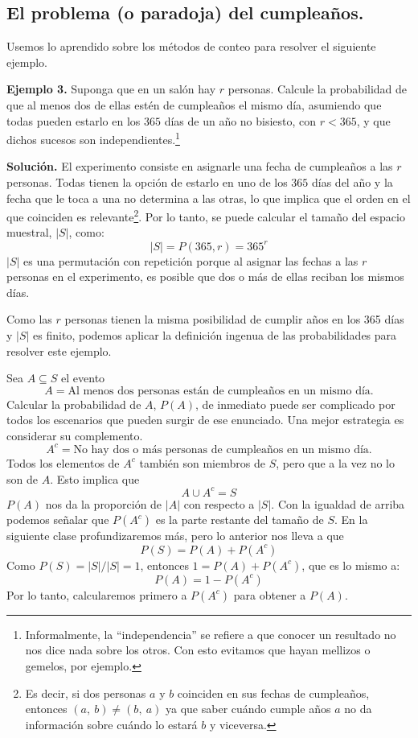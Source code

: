 \documentclass[12pt]{article}
\begin{document}
\subsection{El problema (o paradoja) del cumpleaños.}

Usemos lo aprendido sobre los métodos de conteo para resolver el siguiente ejemplo.

\textbf{Ejemplo 3.} Suponga que en un salón hay $r$ personas. Calcule la probabilidad de que al menos dos de ellas estén de cumpleaños el mismo día, asumiendo que todas pueden estarlo en los $365$ días de un año no bisiesto, con $r < 365$, y que dichos sucesos son independientes.\footnote{Informalmente, la ``independencia'' se refiere a que conocer un resultado no nos dice nada sobre los otros. Con esto evitamos que hayan mellizos o gemelos, por ejemplo.}

\textbf{Solución.} El experimento consiste en asignarle una fecha de cumpleaños a las $r$ personas. Todas tienen la opción de estarlo en uno de los $365$ días del año y la fecha que le toca a una no determina a las otras, lo que implica que el orden en el que coinciden es relevante\footnote{Es decir, si dos personas $a$ y $b$ coinciden en sus fechas de cumpleaños, entonces $(a, \ b) \neq (b, \ a)$ ya que saber cuándo cumple años $a$ no da información sobre cuándo lo estará $b$ y viceversa.}. Por lo tanto, se puede calcular el tamaño del espacio muestral, $|S|$, como:
\[
  |S| = P(365, r) = 365^{r}
\]
$|S|$ es una permutación con repetición porque al asignar las fechas a las $r$ personas en el experimento, es posible que dos o más de ellas reciban los mismos días.

Como las $r$ personas tienen la misma posibilidad de cumplir años en los 365 días y $|S|$ es finito, podemos aplicar la definición ingenua de las probabilidades para resolver este ejemplo.

Sea $A \subseteq S$ el evento
\[
  A = \text{Al menos dos personas están de cumpleaños en un mismo día.}
\]
Calcular la probabilidad de $A$, $P(A)$, de inmediato puede ser complicado por todos los escenarios que pueden surgir de ese enunciado. Una mejor estrategia es considerar su complemento.
\[
  A^{c} = \text{No hay dos o más personas de cumpleaños en un mismo día.}
\]
Todos los elementos de $A^{c}$ también son miembros de $S$, pero que a la vez no lo son de $A$. Esto implica que
\[
  A \cup A^{c} = S
\]
$P(A)$ nos da la proporción de $|A|$ con respecto a $|S|$. Con la igualdad de arriba podemos señalar que $P(A^{c})$ es la parte restante del tamaño de $S$. En la siguiente clase profundizaremos más, pero lo anterior nos lleva a que
\[
  P(S) = P(A) + P(A^{c})
\]
Como $P(S) = |S| / |S| = 1$, entonces $1 = P(A) + P(A^{c})$, que es lo mismo a:
\[
  P(A) = 1 - P(A^{c})
\]
Por lo tanto, calcularemos primero a $P(A^{c})$ para obtener a $P(A)$.
\end{document}
